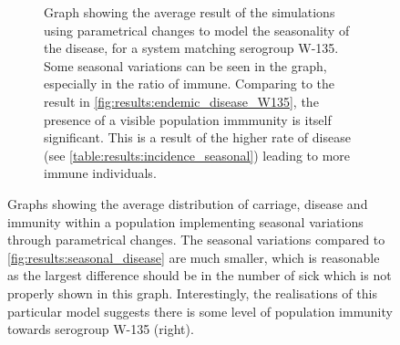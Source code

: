 \documentclass[10pt,a4paper]{article}
\begin{document}
\begin{figure}
\begin{subfigure}{0.45\textwidth}
		\caption{Graph showing the average result of the simulations using parametrical changes to model the seasonality of the disease, for a system matching serogroup W-135. Some seasonal variations can be seen in the graph, especially in the ratio of immune. Comparing to the result in \cref{fig:results:endemic_disease_W135}, the presence of a visible population immmunity is itself significant. This is a result of the higher rate of disease (see \cref{table:results:incidence_seasonal}) leading to more immune individuals.} \label{fig:results:seasonal_aves_W135_parameters}
	\end{subfigure}
	\caption{Graphs showing the average distribution of carriage, disease and immunity within a population implementing seasonal variations through parametrical changes. The seasonal variations compared to \cref{fig:results:seasonal_disease} are much smaller, which is reasonable as the largest difference should be in the number of sick which is not properly shown in this graph. Interestingly, the realisations of this particular model suggests there is some level of population immunity towards serogroup W-135 (right).} \label{fig:results:seasonal_disease_parameters}
\end{figure}






\end{document}

